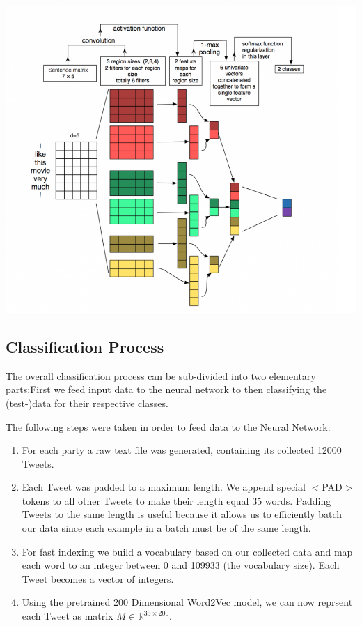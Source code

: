 \documentclass[10pt, oneside]{article}
\newenvironment{Figure}
	{\par\medskip\noindent\minipage{\linewidth}}
	{\endminipage\par\medskip}
\begin{document}
\begin{multicols}{2}
\begin{Figure}
	\centering
	\includegraphics[width=\linewidth]{images/cnn_architecture2.png}
\end{Figure}


\subsection{Classification Process}

The overall classification process can be sub-divided into two elementary parts:First we feed input data to the neural network to then classifying the (test-)data for their respective classes.

The following steps were taken in order to feed data to the Neural Network:

\begin{enumerate}
\item For each party a raw text file was generated, containing its collected 12000 Tweets.
\item Each Tweet was padded to a maximum length. We append special $<$PAD$>$ tokens to all other Tweets to make their length equal 35 words. Padding Tweets to the same length is useful because it allows us to efficiently batch our data since each example in a batch must be of the same length.
\item For fast indexing we build a vocabulary based on our collected data and map each word to an integer between 0 and 109933 (the vocabulary size). Each Tweet becomes a vector of integers.
\item Using the pretrained 200 Dimensional Word2Vec model, we can now reprsent each Tweet as matrix $M \in \mathbb{R}^{35 \times 200}$.
\end{enumerate}


\end{multicols}
\end{document}
